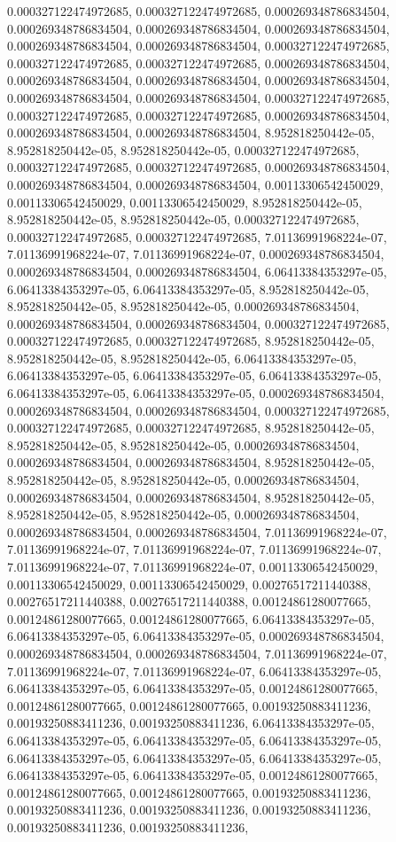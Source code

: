 \documentclass[
  ,man]{apa6}
\begin{document}
0.000327122474972685, 0.000327122474972685, 0.000269348786834504, 0.000269348786834504, 0.000269348786834504, 0.000269348786834504, 0.000269348786834504, 0.000269348786834504, 0.000327122474972685, 0.000327122474972685, 0.000327122474972685, 0.000269348786834504, 0.000269348786834504, 0.000269348786834504, 0.000269348786834504, 0.000269348786834504, 0.000269348786834504, 0.000327122474972685, 0.000327122474972685, 0.000327122474972685, 0.000269348786834504, 0.000269348786834504, 0.000269348786834504,
8.952818250442e-05, 8.952818250442e-05, 8.952818250442e-05, 0.000327122474972685, 0.000327122474972685, 0.000327122474972685, 0.000269348786834504, 0.000269348786834504, 0.000269348786834504, 0.00113306542450029, 0.00113306542450029, 0.00113306542450029, 8.952818250442e-05, 8.952818250442e-05, 8.952818250442e-05, 0.000327122474972685, 0.000327122474972685, 0.000327122474972685, 7.01136991968224e-07, 7.01136991968224e-07, 7.01136991968224e-07, 0.000269348786834504, 0.000269348786834504, 0.000269348786834504,
6.06413384353297e-05, 6.06413384353297e-05, 6.06413384353297e-05, 8.952818250442e-05, 8.952818250442e-05, 8.952818250442e-05, 0.000269348786834504, 0.000269348786834504, 0.000269348786834504, 0.000327122474972685, 0.000327122474972685, 0.000327122474972685, 8.952818250442e-05, 8.952818250442e-05, 8.952818250442e-05, 6.06413384353297e-05, 6.06413384353297e-05, 6.06413384353297e-05, 6.06413384353297e-05, 6.06413384353297e-05, 6.06413384353297e-05, 0.000269348786834504, 0.000269348786834504, 0.000269348786834504,
0.000327122474972685, 0.000327122474972685, 0.000327122474972685, 8.952818250442e-05, 8.952818250442e-05, 8.952818250442e-05, 0.000269348786834504, 0.000269348786834504, 0.000269348786834504, 8.952818250442e-05, 8.952818250442e-05, 8.952818250442e-05, 0.000269348786834504, 0.000269348786834504, 0.000269348786834504, 8.952818250442e-05, 8.952818250442e-05, 8.952818250442e-05, 0.000269348786834504, 0.000269348786834504, 0.000269348786834504, 7.01136991968224e-07, 7.01136991968224e-07, 7.01136991968224e-07,
7.01136991968224e-07, 7.01136991968224e-07, 7.01136991968224e-07, 0.00113306542450029, 0.00113306542450029, 0.00113306542450029, 0.00276517211440388, 0.00276517211440388, 0.00276517211440388, 0.00124861280077665, 0.00124861280077665, 0.00124861280077665, 6.06413384353297e-05, 6.06413384353297e-05, 6.06413384353297e-05, 0.000269348786834504, 0.000269348786834504, 0.000269348786834504, 7.01136991968224e-07, 7.01136991968224e-07, 7.01136991968224e-07, 6.06413384353297e-05, 6.06413384353297e-05, 6.06413384353297e-05,
0.00124861280077665, 0.00124861280077665, 0.00124861280077665, 0.00193250883411236, 0.00193250883411236, 0.00193250883411236, 6.06413384353297e-05, 6.06413384353297e-05, 6.06413384353297e-05, 6.06413384353297e-05, 6.06413384353297e-05, 6.06413384353297e-05, 6.06413384353297e-05, 6.06413384353297e-05, 6.06413384353297e-05, 0.00124861280077665, 0.00124861280077665, 0.00124861280077665, 0.00193250883411236, 0.00193250883411236, 0.00193250883411236, 0.00193250883411236, 0.00193250883411236, 0.00193250883411236,
\end{document}
